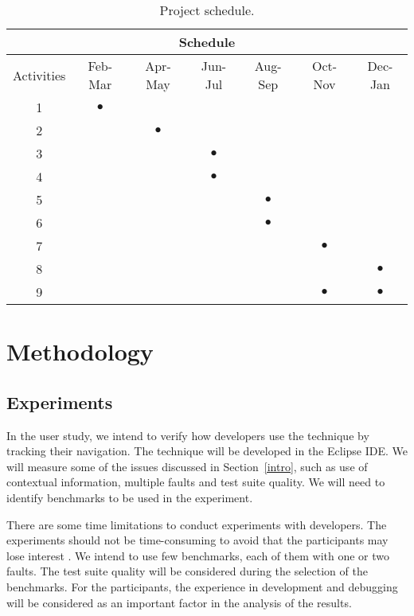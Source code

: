 \documentclass[12pt,a4paper,espaco=umemeio,noindentfirst,oneside,openany,tocpage=plain,pnumromarab,ruledheader,time,anapcustomindent]{sty/abnt}
\begin{document}
\begin{table}
\caption{Project schedule.}
\label{tab-timeline}
\centering
\begin{tabular}{|c||c|c|c|c|c|c|}
\hline
\multicolumn{7}{|c|}{Schedule} \\
\hline
\cline{2-7} Activities & Feb-Mar & Apr-May & Jun-Jul & Aug-Sep & Oct-Nov & Dec-Jan \\
\hline 1 & $\bullet$ &  &  &  &  &  \\
\hline 2 &  & $\bullet$ &  &  &  &  \\
\hline 3 &  &  & $\bullet$ &  &  &  \\
\hline 4 &  &  & $\bullet$ &  &  &  \\
\hline 5 &  &  &  & $\bullet$ &  &  \\
\hline 6 &  &  &  & $\bullet$ &  &  \\
\hline 7 &  &  &  &  & $\bullet$ &  \\
\hline 8 &  &  &  &  &  & $\bullet$ \\
\hline 9 &  &  &  &  & $\bullet$ & $\bullet$ \\
\hline
\end{tabular}
\end{table}

\section{Methodology}
\label{methodology}

\subsection{Experiments}
\label{experiments}

In the user study, we intend to verify how developers use the technique by tracking their navigation. The technique will 
be developed in the Eclipse IDE. We will measure some of the issues discussed in Section~\ref{intro}, such as use of 
contextual information, multiple faults and test suite quality. We will need to identify benchmarks to be used in the 
experiment.

There are some time limitations to conduct experiments with developers. The experiments should not be time-consuming 
to avoid that the participants may lose interest \cite{wainer2006}. We intend to use few benchmarks, each of them with 
one or two faults. The test suite quality will be considered during the selection of the benchmarks. For the participants, 
the experience in development and debugging will be considered as an important factor in the analysis of the results.
\end{document}
